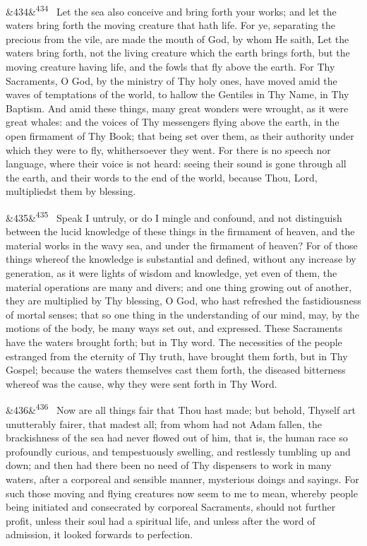 \documentclass[12pt]{article}
\newcommand{\para}[1][]{\par\noindent\ifx&#1&\else\textsuperscript{\footnotesize #1}~\fi}
\begin{document}
\para[434] Let the sea also conceive and bring forth your works; and let the waters bring forth the moving creature that hath life. For ye, separating the precious from the vile, are made the mouth of God, by whom He saith, Let the waters bring forth, not the living creature which the earth brings forth, but the moving creature having life, and the fowls that fly above the earth. For Thy Sacraments, O God, by the ministry of Thy holy ones, have moved amid the waves of temptations of the world, to hallow the Gentiles in Thy Name, in Thy Baptism. And amid these things, many great wonders were wrought, as it were great whales: and the voices of Thy messengers flying above the earth, in the open firmament of Thy Book; that being set over them, as their authority under which they were to fly, whithersoever they went. For there is no speech nor language, where their voice is not heard: seeing their sound is gone through all the earth, and their words to the end of the world, because Thou, Lord, multipliedst them by blessing.

\para[435] Speak I untruly, or do I mingle and confound, and not distinguish between the lucid knowledge of these things in the firmament of heaven, and the material works in the wavy sea, and under the firmament of heaven? For of those things whereof the knowledge is substantial and defined, without any increase by generation, as it were lights of wisdom and knowledge, yet even of them, the material operations are many and divers; and one thing growing out of another, they are multiplied by Thy blessing, O God, who hast refreshed the fastidiousness of mortal senses; that so one thing in the understanding of our mind, may, by the motions of the body, be many ways set out, and expressed. These Sacraments have the waters brought forth; but in Thy word. The necessities of the people estranged from the eternity of Thy truth, have brought them forth, but in Thy Gospel; because the waters themselves cast them forth, the diseased bitterness whereof was the cause, why they were sent forth in Thy Word.

\para[436] Now are all things fair that Thou hast made; but behold, Thyself art unutterably fairer, that madest all; from whom had not Adam fallen, the brackishness of the sea had never flowed out of him, that is, the human race so profoundly curious, and tempestuously swelling, and restlessly tumbling up and down; and then had there been no need of Thy dispensers to work in many waters, after a corporeal and sensible manner, mysterious doings and sayings. For such those moving and flying creatures now seem to me to mean, whereby people being initiated and consecrated by corporeal Sacraments, should not further profit, unless their soul had a spiritual life, and unless after the word of admission, it looked forwards to perfection.
\end{document}
